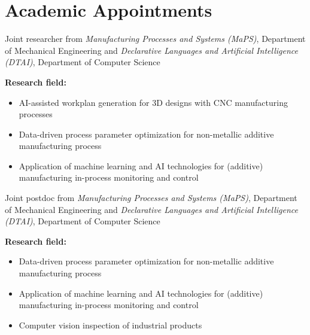\documentclass{resume}
\begin{document}
\section{Academic Appointments}
Joint researcher from \textit{Manufacturing Processes and Systems (MaPS)}, Department of Mechanical Engineering and \textit{Declarative Languages and Artificial Intelligence (DTAI)}, Department of Computer Science\par
\vspace{1mm}
\textbf{Research field:}
\begin{itemize}[parsep=0.5ex]
  \item AI-assisted workplan generation for 3D designs with CNC manufacturing processes
  \item Data-driven process parameter optimization for non-metallic additive manufacturing process
  \item Application of machine learning and AI technologies for (additive) manufacturing in-process monitoring and control
\end{itemize}

Joint postdoc from \textit{Manufacturing Processes and Systems (MaPS)}, Department of Mechanical Engineering and \textit{Declarative Languages and Artificial Intelligence (DTAI)}, Department of Computer Science\par
\vspace{1mm}
\textbf{Research field:}
\begin{itemize}[parsep=0.5ex]
  \item Data-driven process parameter optimization for non-metallic additive manufacturing process
  \item Application of machine learning and AI technologies for (additive) manufacturing in-process monitoring and control
  \item Computer vision inspection of industrial products
\end{itemize}
\end{document}
